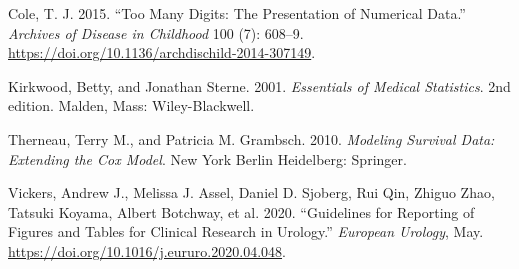 \documentclass[
  a4paper,
]{memoir}
\newlength{\cslhangindent}
\newlength{\cslentryspacingunit} %
\newenvironment{CSLReferences}[2] %
 {%
  \setlength{\parindent}{0pt}
  \ifodd #1
  \let\oldpar\par
  \def\par{\hangindent=\cslhangindent\oldpar}
  \fi
  \setlength{\parskip}{#2\cslentryspacingunit}
 }%
 {}
\begin{document}
\begin{CSLReferences}{1}{0}
\leavevmode{}%
Cole, T. J. 2015. {``Too Many Digits: The Presentation of Numerical
Data.''} \emph{Archives of Disease in Childhood} 100 (7): 608--9.
\url{https://doi.org/10.1136/archdischild-2014-307149}.

\leavevmode{}%
Kirkwood, Betty, and Jonathan Sterne. 2001. \emph{Essentials of {Medical
Statistics}}. 2nd edition. Malden, Mass: Wiley-Blackwell.

\leavevmode{}%
Therneau, Terry M., and Patricia M. Grambsch. 2010. \emph{Modeling
{Survival Data}: {Extending} the {Cox Model}}. New York Berlin
Heidelberg: Springer.

\leavevmode{}%
Vickers, Andrew J., Melissa J. Assel, Daniel D. Sjoberg, Rui Qin, Zhiguo
Zhao, Tatsuki Koyama, Albert Botchway, et al. 2020. {``Guidelines for
{Reporting} of {Figures} and {Tables} for {Clinical Research} in
{Urology}.''} \emph{European Urology}, May.
\url{https://doi.org/10.1016/j.eururo.2020.04.048}.

\end{CSLReferences}


\backmatter
\end{document}
